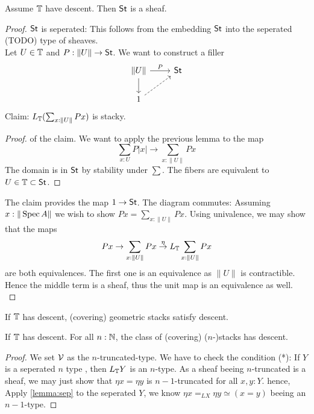 \begin{theorem}
	Assume $\mathbb{T}$ have descent. Then $\mathsf{St}$ is a sheaf.
\end{theorem}
\begin{proof}
	$\mathsf{St}$ is seperated: This follows from the embedding $\mathsf{St}$ into the seperated (TODO) type of sheaves. \\
	Let $U \in \mathbb{T}$ and $P : \|U\| \to \mathsf{St}$. We want to construct a filler 
	\[\begin{tikzcd}
		{\| U\|} & \St \\
		1
		\arrow["P", from=1-1, to=1-2]
		\arrow[from=1-1, to=2-1]
		\arrow[dashed, from=2-1, to=1-2]
	\end{tikzcd}\]
	Claim: $L_{\mathbb{T}} (\sum_{x: \|U\|} P x)$ is stacky.
	\begin{proof} of the claim. We want to apply the previous lemma to the map 
		\[\sum_{x : U} P | x | \to \sum_{x : \| U\|} P x \]
		The domain is in $\mathsf{St}$ by stability under $\sum$. The fibers are equivalent to $U \in \mathbb{T} \subset \mathsf{St}$.				
	\end{proof}
	The claim provides the map $1 \to \mathsf{St}$. The diagram commutes: Assuming $x : \|\operatorname{Spec} A\|$ we wish to show $P x = \sum_{x: \|U\|} P x$. Using univalence, we may show that the maps 
	\[P x \to \sum_{x: \|U\|} P x \overset{\eta}{\to} L_{\mathbb{T}} \sum_{x: \|U\|} P x\]
	are both equivalences.
	The first one is an equivalence as $\|U\|$ is contractible. Hence the middle term is a sheaf, thus the unit map is an equivalence as well. \\
	
	
	
\end{proof}
\begin{corollary}
	If $\mathbb{T}$ has descent, (covering) geometric stacks satisfy descent.
\end{corollary}

\begin{corollary}
	If $\mathbb{T}$ has descent. For all $n : \mathbb{N} $, the class of (covering) ($n$-)stacks has descent.
\end{corollary}
\begin{proof}
	We set $\mathcal{V}$ as the $n$-truncated-type. We have to check the condition (*):
	If $Y$ is a seperated $n$ type , then $L_{\mathbb{T}} Y$ is an $n$-type.
	As a sheaf beeing $n$-truncated is a sheaf, we may just show that $\eta x = \eta y$ is $n-1$-truncated for all $x , y : Y$.
	hence, Apply \ref{lemma:sep} to the seperated $Y$, we know $\eta x =_{L X} \eta y \simeq (x=y) $ beeing an $n-1$-type.
	
\end{proof}

